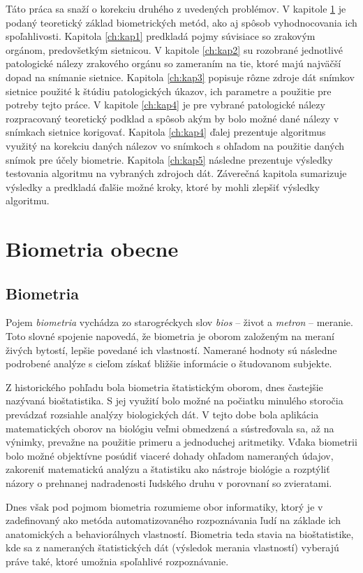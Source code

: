 Táto práca sa snaží o korekciu druhého z uvedených problémov. V kapitole \ref{ch:kap0} je podaný teoretický základ biometrických metód, ako aj spôsob vyhodnocovania ich spoľahlivosti. Kapitola \ref{ch:kap1} predkladá pojmy súvisiace so zrakovým orgánom, predovšetkým sietnicou. V kapitole \ref{ch:kap2} su rozobrané jednotlivé patologické nálezy zrakového orgánu so zameraním na tie, ktoré majú najväčší dopad na snímanie sietnice. Kapitola \ref{ch:kap3} popisuje rôzne zdroje dát snímkov sietnice použité k štúdiu patologických úkazov, ich parametre a použitie pre potreby tejto práce. V kapitole \ref{ch:kap4} je pre vybrané patologické nálezy rozpracovaný teoretický podklad a spôsob akým by bolo možné dané nálezy v snímkach sietnice korigovať. Kapitola \ref{ch:kap4} ďalej prezentuje algoritmus využitý na korekciu daných nálezov vo snímkoch s ohľadom na použitie daných snímok pre účely biometrie. Kapitola \ref{ch:kap5} následne prezentuje výsledky testovania algoritmu na vybraných zdrojoch dát. Záverečná kapitola sumarizuje výsledky a predkladá ďalšie možné kroky, ktoré by mohli zlepšiť výsledky algoritmu.

\chapter{Biometria obecne}\label{ch:kap0}
\section{Biometria}
Pojem \emph{biometria} vychádza zo starogréckych slov \emph{bios} -- život a \emph{metron} -- meranie\cite{hist}. Toto slovné spojenie napovedá, že biometria je oborom založeným na meraní živých bytostí, lepšie povedané ich vlastností. Namerané hodnoty sú následne podrobené analýze s cieľom získať bližšie informácie o študovanom subjekte.

Z historického pohľadu bola biometria štatistickým oborom, dnes častejšie nazývaná bioštatistika. S jej využití bolo možné na počiatku minulého storočia prevádzať rozsiahle analýzy biologických dát. V tejto dobe bola aplikácia matematických oborov na biológiu veľmi obmedzená a sústreďovala sa, až na výnimky, prevažne na použitie primeru a jednoduchej aritmetiky. Vďaka biometrii bolo možné objektívne posúdiť viaceré dohady ohľadom nameraných údajov, zakoreniť matematickú analýzu a štatistiku ako nástroje biológie a rozptýliť názory o prehnanej nadradenosti ľudského druhu v porovnaní so zvieratami\cite{hist}.

Dnes však pod pojmom biometria rozumieme obor informatiky, ktorý je v \cite{bio} zadefinovaný ako metóda automatizovaného rozpoznávania ľudí na základe ich anatomických a behaviorálnych vlastností. Biometria teda stavia na bioštatistike, kde sa z nameraných štatistických dát (výsledok merania vlastností) vyberajú práve také, ktoré umožnia spoľahlivé rozpoznávanie.

